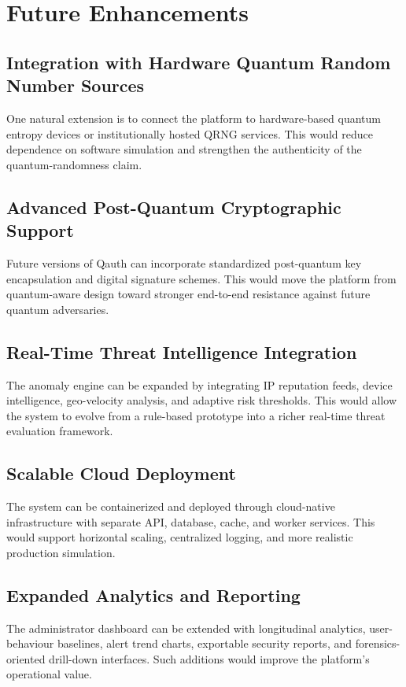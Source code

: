 \documentclass[12pt,a4paper]{report}
\begin{document}
\section{Future Enhancements}

\subsection{Integration with Hardware Quantum Random Number Sources}
One natural extension is to connect the platform to hardware-based quantum entropy devices or institutionally hosted QRNG services. This would reduce dependence on software simulation and strengthen the authenticity of the quantum-randomness claim.

\subsection{Advanced Post-Quantum Cryptographic Support}
Future versions of Qauth can incorporate standardized post-quantum key encapsulation and digital signature schemes. This would move the platform from quantum-aware design toward stronger end-to-end resistance against future quantum adversaries.

\subsection{Real-Time Threat Intelligence Integration}
The anomaly engine can be expanded by integrating IP reputation feeds, device intelligence, geo-velocity analysis, and adaptive risk thresholds. This would allow the system to evolve from a rule-based prototype into a richer real-time threat evaluation framework.

\subsection{Scalable Cloud Deployment}
The system can be containerized and deployed through cloud-native infrastructure with separate API, database, cache, and worker services. This would support horizontal scaling, centralized logging, and more realistic production simulation.

\subsection{Expanded Analytics and Reporting}
The administrator dashboard can be extended with longitudinal analytics, user-behaviour baselines, alert trend charts, exportable security reports, and forensics-oriented drill-down interfaces. Such additions would improve the platform's operational value.
\end{document}
